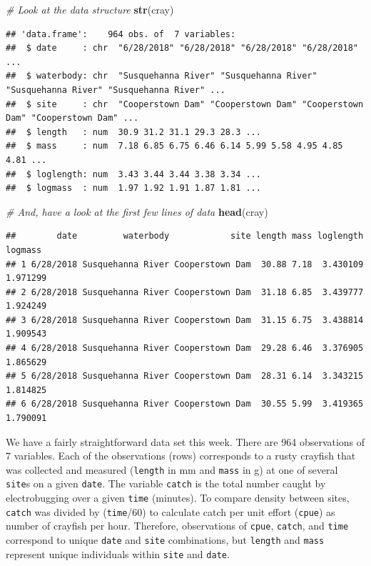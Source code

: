 \documentclass[
]{book}
\newenvironment{Shaded}{\begin{snugshade}}{\end{snugshade}}
\newcommand{\CommentTok}[1]{\textcolor[rgb]{0.56,0.35,0.01}{\textit{#1}}}
\newcommand{\KeywordTok}[1]{\textcolor[rgb]{0.13,0.29,0.53}{\textbf{#1}}}
\newcommand{\NormalTok}[1]{#1}
\begin{document}
\begin{Shaded}
\begin{Highlighting}[]
\CommentTok{# Look at the data structure}
\KeywordTok{str}\NormalTok{(cray)}
\end{Highlighting}
\end{Shaded}

\begin{verbatim}
## 'data.frame':	964 obs. of  7 variables:
##  $ date     : chr  "6/28/2018" "6/28/2018" "6/28/2018" "6/28/2018" ...
##  $ waterbody: chr  "Susquehanna River" "Susquehanna River" "Susquehanna River" "Susquehanna River" ...
##  $ site     : chr  "Cooperstown Dam" "Cooperstown Dam" "Cooperstown Dam" "Cooperstown Dam" ...
##  $ length   : num  30.9 31.2 31.1 29.3 28.3 ...
##  $ mass     : num  7.18 6.85 6.75 6.46 6.14 5.99 5.58 4.95 4.85 4.81 ...
##  $ loglength: num  3.43 3.44 3.44 3.38 3.34 ...
##  $ logmass  : num  1.97 1.92 1.91 1.87 1.81 ...
\end{verbatim}

\begin{Shaded}
\begin{Highlighting}[]
\CommentTok{# And, have a look at the first few lines of data}
\KeywordTok{head}\NormalTok{(cray)}
\end{Highlighting}
\end{Shaded}

\begin{verbatim}
##        date         waterbody            site length mass loglength  logmass
## 1 6/28/2018 Susquehanna River Cooperstown Dam  30.88 7.18  3.430109 1.971299
## 2 6/28/2018 Susquehanna River Cooperstown Dam  31.18 6.85  3.439777 1.924249
## 3 6/28/2018 Susquehanna River Cooperstown Dam  31.15 6.75  3.438814 1.909543
## 4 6/28/2018 Susquehanna River Cooperstown Dam  29.28 6.46  3.376905 1.865629
## 5 6/28/2018 Susquehanna River Cooperstown Dam  28.31 6.14  3.343215 1.814825
## 6 6/28/2018 Susquehanna River Cooperstown Dam  30.55 5.99  3.419365 1.790091
\end{verbatim}

We have a fairly straightforward data set this week. There are 964 observations of 7 variables. Each of the observations (rows) corresponds to a rusty crayfish that was collected and measured (\texttt{length} in mm and \texttt{mass} in g) at one of several \texttt{site}s on a given \texttt{date}. The variable \texttt{catch} is the total number caught by electrobugging over a given \texttt{time} (minutes). To compare density between sites, \texttt{catch} was divided by (\texttt{time}/60) to calculate catch per unit effort (\texttt{cpue}) as number of crayfish per hour. Therefore, observations of \texttt{cpue}, \texttt{catch}, and \texttt{time} correspond to unique \texttt{date} and \texttt{site} combinations, but \texttt{length} and \texttt{mass} represent unique individuals within \texttt{site} and \texttt{date}.
\end{document}
